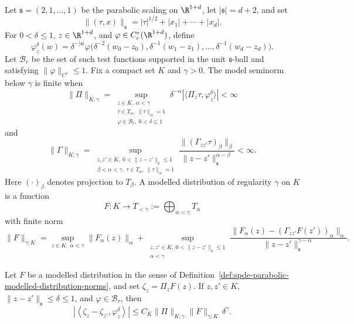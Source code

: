 \begin{definition}
\label{def:spde-parabolic-modelled-distribution-norms}
Let \(\mathfrak s=(2,1,\ldots,1)\) be the parabolic scaling on
\(\R^{1+d}\), let \(|\mathfrak s|=d+2\), and set
\[
  \|(\tau,x)\|_{\mathfrak s}
  =
  |\tau|^{1/2}+|x_1|+\cdots+|x_d|.
\]
For \(0<\delta\leq1\), \(z\in\R^{1+d}\), and
\(\varphi\in C_c^r(\R^{1+d})\), define
\[
  \varphi_z^\delta(w)
  =
  \delta^{-|\mathfrak s|}
  \varphi\bigl(\delta^{-2}(w_0-z_0),
               \delta^{-1}(w_1-z_1),\ldots,
               \delta^{-1}(w_d-z_d)\bigr).
\]
Let \(\mathcal B_r\) be the set of such test functions supported in the unit
\(\mathfrak s\)-ball and satisfying \(\|\varphi\|_{C^r}\leq1\).  Fix a
compact set \(K\) and \(\gamma>0\).  The model seminorm below \(\gamma\) is
finite when
\[
  \|\Pi\|_{K;\gamma}
  =
  \sup_{\substack{z\in K,\ \alpha<\gamma\\
                  \tau\in T_\alpha,\ \|\tau\|_\alpha=1\\
                  \varphi\in\mathcal B_r,\ 0<\delta\leq1}}
  \delta^{-\alpha}
  \left|\langle\Pi_z\tau,\varphi_z^\delta\rangle\right|
  <\infty
\]
and
\[
  \|\Gamma\|_{K;\gamma}
  =
  \sup_{\substack{z,z'\in K,\ 0<\|z-z'\|_{\mathfrak s}\leq1\\
                  \beta<\alpha<\gamma,\ \tau\in T_\alpha,\ \|\tau\|_\alpha=1}}
  \frac{\|(\Gamma_{zz'}\tau)_\beta\|_\beta}
       {\|z-z'\|_{\mathfrak s}^{\alpha-\beta}}
  <\infty .
\]
Here \((\cdot)_\beta\) denotes projection to \(T_\beta\).  A modelled
distribution of regularity \(\gamma\) on \(K\) is a function
\[
  F:K\longrightarrow T_{<\gamma}:=\bigoplus_{\alpha<\gamma}T_\alpha
\]
with finite norm
\[
  \|F\|_{\gamma;K}
  =
  \sup_{z\in K,\ \alpha<\gamma}\|F_\alpha(z)\|_\alpha
  +
  \sup_{\substack{z,z'\in K,\ 0<\|z-z'\|_{\mathfrak s}\leq1\\ \alpha<\gamma}}
  \frac{\|F_\alpha(z)-(\Gamma_{zz'}F(z'))_\alpha\|_\alpha}
       {\|z-z'\|_{\mathfrak s}^{\gamma-\alpha}} .
\]
\end{definition}

\begin{lemma}
\label{lem:spde-modelled-germ-coherence}
Let \(F\) be a modelled distribution in the sense of
Definition~\ref{def:spde-parabolic-modelled-distribution-norms}, and set
\(\zeta_z=\Pi_zF(z)\).  If \(z,z'\in K\),
\(\|z-z'\|_{\mathfrak s}\leq\delta\leq1\), and
\(\varphi\in\mathcal B_r\), then
\[
  \left|
    \left\langle \zeta_z-\zeta_{z'},\varphi_z^\delta\right\rangle
  \right|
  \leq
  C_K\|\Pi\|_{K;\gamma}\|F\|_{\gamma;K}\,\delta^\gamma .
\]
\end{lemma}

